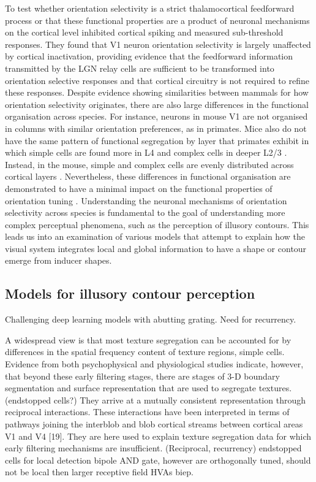 \documentclass[12pt]{article}
\begin{document}
To test whether orientation selectivity is a strict thalamocortical feedforward process or that these functional properties are a product of neuronal mechanisms on the cortical level \textcite{fersterOrientationSelectivityThalamic1996} inhibited cortical spiking and measured sub-threshold responses. They found that V1 neuron orientation selectivity is largely unaffected by cortical inactivation, providing evidence that the feedforward information transmitted by the LGN relay cells are sufficient to be transformed into orientation selective responses and that cortical circuitry is not required to refine these responses. Despite evidence showing similarities between mammals for how orientation selectivity originates, there are also large differences in the functional organisation across species. For instance, neurons in mouse V1 are not organised in columns with similar orientation preferences, as in primates. Mice also do not have the same pattern of functional segregation by layer that primates exhibit in which simple cells are found more in L4 and complex cells in deeper L2/3 \autocite{martinezReceptiveFieldStructure2005}. Instead, in the mouse, simple and complex cells are evenly distributed across cortical layers \autocite{niellHighlySelectiveReceptive2008}. Nevertheless, these differences in functional organisation are demonstrated to have a minimal impact on the functional properties of orientation tuning \autocite{hooserOrientationSelectivityOrientation2005}. Understanding the neuronal mechanisms of orientation selectivity across species is fundamental to the goal of understanding more complex perceptual phenomena, such as the perception of illusory contours. This leads us into an examination of various models that attempt to explain how the visual system integrates local and global information to have a shape or contour emerge from inducer shapes.    

\subsection{Models for illusory contour perception}
Challenging deep learning models with abutting grating. Need for recurrency.

A widespread view is that most texture segregation can be accounted for by differences in the spatial frequency content of texture regions, simple cells. Evidence from both psychophysical and physiological studies indicate, however, that beyond these early filtering stages, there are stages of 3-D boundary segmentation and surface representation that are used to segregate textures. \autocite{grossbergTextureSegregationSurface1998} (endstopped cells?)
They arrive at a
mutually consistent representation through reciprocal
interactions. These interactions have been interpreted in
terms of pathways joining the interblob and blob cortical streams between cortical areas V1 and V4 [19]. They
are here used to explain texture segregation data for
which early filtering mechanisms are insufficient. (Reciprocal, recurrency)
endstopped cells for local detection
bipole AND gate, however are orthogonally tuned, should not be local then larger receptive field HVAs
biep.
\end{document}
